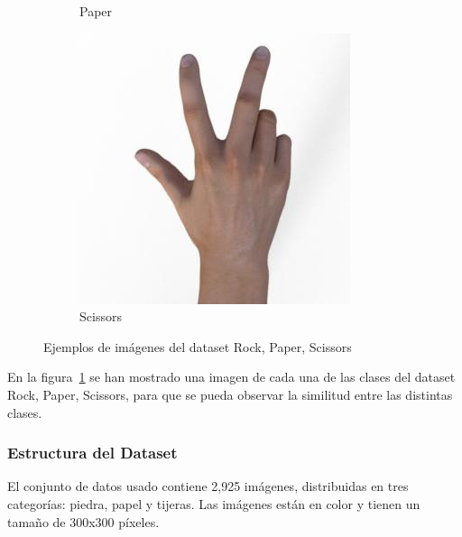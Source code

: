 \begin{figure}[htp]
\begin{subfigure}[t]{0.3\textwidth}
        \caption*{Paper}
    \end{subfigure}
    \begin{subfigure}[t]{0.3\textwidth}
        \centering
        \includegraphics[width=\linewidth]{imagenes/dataset_examples/scissors.jpg}
        \caption*{Scissors}
    \end{subfigure}
    \caption{Ejemplos de imágenes del dataset Rock, Paper, Scissors}
    \label{fig:ejemplos-rps}
\end{figure}

En la figura~\ref{fig:ejemplos-rps} se han mostrado una imagen de cada una de las clases del dataset Rock, Paper, Scissors,
para que se pueda observar la similitud entre las distintas clases.

\subsubsection{Estructura del Dataset}
El conjunto de datos usado contiene 2,925 imágenes, distribuidas en tres categorías: piedra, papel y tijeras.
Las imágenes están en color y tienen un tamaño de 300x300 píxeles.

